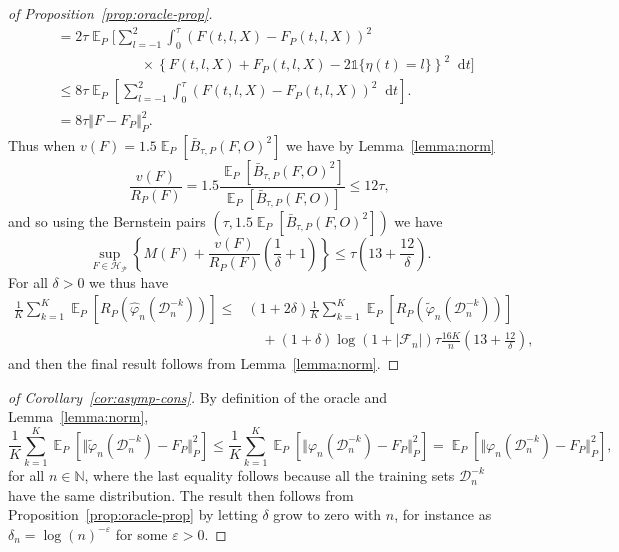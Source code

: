 \documentclass[lineno]{biometrika}
\DeclareMathOperator{\E}{\mathbb{E}} %
\newcommand{\N}{\mathbb{N}}
\renewcommand{\phi}{\varphi}
\renewcommand{\epsilon}{\varepsilon}
\newcommand*\diff{\mathop{}\!\mathrm{d}}
\newcommand{\1}{\mathds{1}}
\newcommand{\data}{\ensuremath{\mathcal{D}}}
\begin{document}
\begin{proof}[of Proposition~\ref{prop:oracle-prop}]
\begin{align*}
  & =2\tau
    \E_{P}\Bigg[
    \sum_{l=-1}^{2} \int_0^{\tau}
    \left(
    F(t, l, X) - F_P(t, l, X)
    \right)^2
  \\
  & \quad \quad \quad\quad \quad \quad \times
    \left\{
    F(t, l, X) +  F_P(t, l, X)-2 \1{\{\eta(t) = l\}}
    \right\}^2
    \diff t 
    \Bigg]
  \\
  & \leq
    8\tau \E_{P}{\left[
    \sum_{l=-1}^{2} \int_0^{\tau}
    \left(
    F(t, l, X) - F_P(t, l, X)
    \right)^2
    \diff t 
    \right]}.
  \\
  & =
    8\tau \Vert F - F_P \Vert_{P}^2.
\end{align*}
Thus when \( v(F) = 1.5 \E_P{[\bar{B}_{\tau,P}(F, O)^2]} \) we have by
Lemma~\ref{lemma:norm}
\begin{equation*}
  \frac{v(F)}{R_P(F)}
  = 1.5 \frac{\E_P{[\bar{B}_{\tau,P}(F, O)^2]}}{\E_P{[\bar{B}_{\tau,P}(F, O)]}}
  \leq 12 \tau,
\end{equation*}
and so using the Bernstein pairs \( (\tau, 1.5 \E_P{[\bar{B}_{\tau,P}(F, O)^2]}) \) we have
\begin{equation*}
  \sup_{F \in \mathcal{H}_{\mathcal{P}}}
  \left\{
    M(F) + \frac{v(F)}{R_P(F)}
    \left(
      \frac{1}{\delta} + 1
    \right)
  \right\}
  \leq \tau
  \left(
    13 + \frac{12}{\delta}
  \right).
\end{equation*}
For all $\delta>0$ we thus have
\begin{align*}
  \frac{1}{K} \sum_{k=1}^{K} \E_{P}{\left[ R_P(\hat{\phi}_n(\data_n^{-k})) \right]}
  \leq
  &(1+2\delta)\frac{1}{K} \sum_{k=1}^{K}\E_{P}{\left[ R_P(\tilde{\phi}_n(\data_n^{-k})) \right]}
  \\
  & \quad
    + (1+\delta)\log(1 + |\mathcal{F}_n|) \tau \frac{16 K}{n}
    \left(
    13 + \frac{12}{\delta}
    \right),
\end{align*}
and then the final result follows from Lemma~\ref{lemma:norm}.
\end{proof}

\begin{proof}[of Corollary~\ref{cor:asymp-cons}]
  By definition of the oracle and Lemma~\ref{lemma:norm},
  \begin{equation*}
    \frac{1}{K} \sum_{k=1}^{K} \E_{P}{\left[ \Vert \tilde{\phi}_n(\data_n^{-k}) - F_P \Vert_{P}^2
      \right]} \leq
    \frac{1}{K} \sum_{k=1}^{K}\E_{P}{\left[ \Vert
        \phi_n(\data_n^{-k}) - F_P \Vert_{P}^2
      \right]}
    =
    \E_{P}{\left[ \Vert \phi_n(\data_n^{-k}) - F_P \Vert_{P}^2
      \right]},
  \end{equation*}
  for all \( n \in \N \), where the last equality follows because all
  the training sets \( \data_n^{-k} \) have the same distribution. The
  result then follows from Proposition~\ref{prop:oracle-prop} by
  letting $\delta$ grow to zero with \( n \), for instance as
  $\delta_n = \log(n)^{-\epsilon}$ for some $\epsilon>0$.
\end{proof}









 
\end{document}
